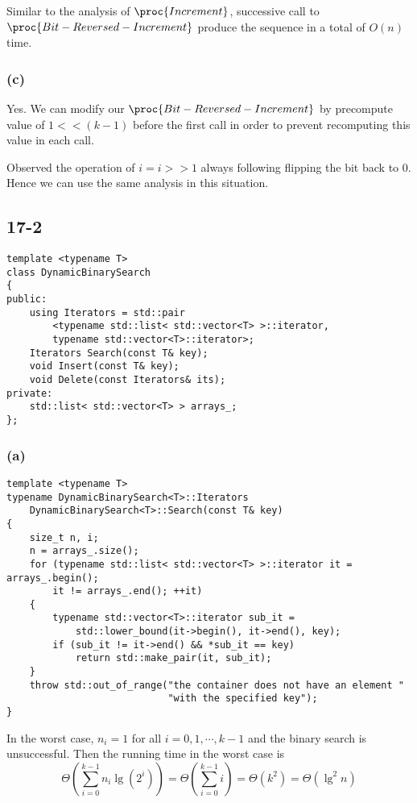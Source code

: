 Similar to the analysis of $\proc{Increment}$,
successive call to $\proc{Bit-Reversed-Increment}$
produce the sequence in a total of $O(n)$ time.

\subsubsection*{(c)}

Yes.
We can modify our $\proc{Bit-Reversed-Increment}$
by precompute value of $1 << (k - 1)$ before the first call
in order to prevent recomputing this value in each call. 

Observed the operation of $i = i >> 1$ always following 
flipping the bit back to $0$.
Hence we can use the same analysis in this situation.

\subsection*{17-2}

\begin{verbatim}
template <typename T>
class DynamicBinarySearch
{
public:
    using Iterators = std::pair
        <typename std::list< std::vector<T> >::iterator, 
        typename std::vector<T>::iterator>;
    Iterators Search(const T& key);
    void Insert(const T& key);
    void Delete(const Iterators& its);
private:
    std::list< std::vector<T> > arrays_;
};
\end{verbatim}
    
\subsubsection*{(a)}

\begin{verbatim}
template <typename T>
typename DynamicBinarySearch<T>::Iterators 
    DynamicBinarySearch<T>::Search(const T& key)
{
    size_t n, i;
    n = arrays_.size();
    for (typename std::list< std::vector<T> >::iterator it = arrays_.begin(); 
        it != arrays_.end(); ++it)
    {
        typename std::vector<T>::iterator sub_it = 
            std::lower_bound(it->begin(), it->end(), key);
        if (sub_it != it->end() && *sub_it == key)
            return std::make_pair(it, sub_it);
    }
    throw std::out_of_range("the container does not have an element "
                            "with the specified key");
}
\end{verbatim}

In the worst case, $n_i = 1$ for all $i = 0, 1, \cdots, k - 1$
and the binary search is unsuccessful.
Then the running time in the worst case is 
\begin{equation*}
    \Theta(\sum\limits_{i = 0}^{k - 1} n_i \lg(2^i))
    = \Theta(\sum\limits_{i = 0}^{k - 1} i)
    = \Theta(k^2)
    = \Theta(\lg^2 n)
\end{equation*}

